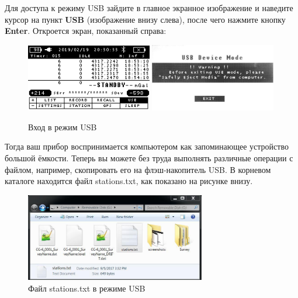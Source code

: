 Для доступа к режиму USB зайдите в главное экранное изображение и наведите
курсор на пункт \textbf{USB} (изображение внизу слева), после чего нажмите
кнопку \textbf{Enter}.  Откроется экран, показанный справа:

\begin{figure}[H]
  \centering
  \includegraphics[width=0.49\textwidth]{figures/entering_usb_mode_1}
  \includegraphics[width=0.49\textwidth]{figures/entering_usb_mode_2}
  \caption{Вход в режим USB}
  \label{fig:entering_usb_mode}
\end{figure}


Тогда ваш прибор \cg{} воспринимается компьютером как запоминающее устройство
большой ёмкости. Теперь вы можете без труда выполнять различные операции с
файлом, например, скопировать его на флэш-накопитель USB. В корневом каталоге
находится файл stations.txt, как показано на рисунке внизу.

\begin{figure}[H]
  \centering
  \includegraphics[width=0.7\textwidth]{figures/stations.txt_file_in_usb_mode}
  \caption{Файл stations.txt в режиме USB}
  \label{fig:stations.txt_file_in_usb_mode}
\end{figure}

